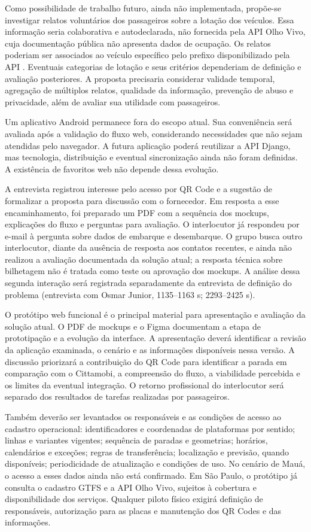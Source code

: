 \documentclass[12pt,oneside,a4paper,brazil,chapter=TITLE]{abntex2}
\begin{document}
Como possibilidade de trabalho futuro, ainda não implementada, propõe-se investigar relatos voluntários dos passageiros sobre a lotação dos veículos. Essa informação seria colaborativa e autodeclarada, não fornecida pela API Olho Vivo, cuja documentação pública não apresenta dados de ocupação. Os relatos poderiam ser associados ao veículo específico pelo prefixo disponibilizado pela API \citep{sptransapi}. Eventuais categorias de lotação e seus critérios dependeriam de definição e avaliação posteriores. A proposta precisaria considerar validade temporal, agregação de múltiplos relatos, qualidade da informação, prevenção de abuso e privacidade, além de avaliar sua utilidade com passageiros.

Um aplicativo Android permanece fora do escopo atual. Sua conveniência será avaliada após a validação do fluxo web, considerando necessidades que não sejam atendidas pelo navegador. A futura aplicação poderá reutilizar a API Django, mas tecnologia, distribuição e eventual sincronização ainda não foram definidas. A existência de favoritos web não depende dessa evolução.

A entrevista registrou interesse pelo acesso por QR Code e a sugestão de formalizar a proposta para discussão com o fornecedor. Em resposta a esse encaminhamento, foi preparado um PDF com a sequência dos mockups, explicações do fluxo e perguntas para avaliação. O interlocutor já respondeu por e-mail à pergunta sobre dados de embarque e desembarque. O grupo busca outro interlocutor, diante da ausência de resposta aos contatos recentes, e ainda não realizou a avaliação documentada da solução atual; a resposta técnica sobre bilhetagem não é tratada como teste ou aprovação dos mockups. A análise dessa segunda interação será registrada separadamente da entrevista de definição do problema  (entrevista com Osmar Junior, 1135--1163 s; 2293--2425 s).

O protótipo web funcional é o principal material para apresentação e avaliação da solução atual. O PDF de mockups e o Figma documentam a etapa de prototipação e a evolução da interface. A apresentação deverá identificar a revisão da aplicação examinada, o cenário e as informações disponíveis nessa versão. A discussão priorizará a contribuição do QR Code para identificar a parada em comparação com o Cittamobi, a compreensão do fluxo, a viabilidade percebida e os limites da eventual integração. O retorno profissional do interlocutor será separado dos resultados de tarefas realizadas por passageiros.

Também deverão ser levantados os responsáveis e as condições de acesso ao cadastro operacional: identificadores e coordenadas de plataformas por sentido; linhas e variantes vigentes; sequência de paradas e geometrias; horários, calendários e exceções; regras de transferência; localização e previsão, quando disponíveis; periodicidade de atualização e condições de uso. No cenário de Mauá, o acesso a esses dados ainda não está confirmado. Em São Paulo, o protótipo já consulta o cadastro GTFS e a API Olho Vivo, sujeitos à cobertura e disponibilidade dos serviços. Qualquer piloto físico exigirá definição de responsáveis, autorização para as placas e manutenção dos QR Codes e das informações.
\end{document}
